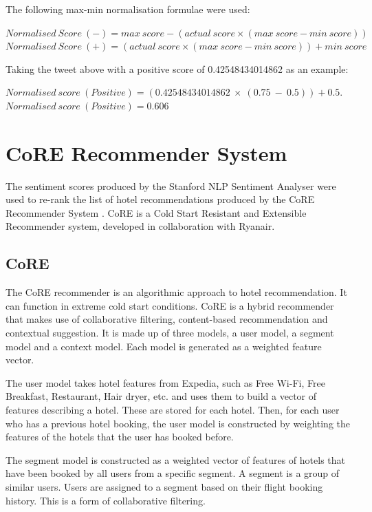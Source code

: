 The following max-min normalisation formulae were used:

\begin{tcolorbox}[title=Normalisation]
$Normalised\ Score\ (-) = max\ score-(actual\ score \times (max\ score - min\ score))$
$Normalised\ Score\ (+) = (actual\ score \times (max\ score - min\ score)) + min\ score$
\end{tcolorbox}

Taking the tweet above with a positive score of 0.42548434014862 as an example:
\begin{tcolorbox}[title=Example]
$Normalised\ score\ (Positive) = (0.42548434014862\ \times\ (0.75\ -\ 0.5)) + 0.5.$
$Normalised\ score\ (Positive) = 0.606$
\end{tcolorbox}

\section{CoRE Recommender System}

The sentiment scores produced by the Stanford NLP Sentiment Analyser \cite{stanfordSentiment2013} were used to re-rank the list of hotel recommendations produced by the CoRE Recommender System \cite{core2019}. CoRE is a Cold Start Resistant and Extensible Recommender system, developed in collaboration with Ryanair. 

\subsection{CoRE}

The CoRE recommender is an algorithmic approach to hotel recommendation. It can function in extreme cold start conditions. CoRE is a hybrid recommender that makes use of collaborative filtering, content-based recommendation and contextual suggestion. It is made up of three models, a user model, a segment model and a context model. Each model is generated as a weighted feature vector.

The user model takes hotel features from Expedia, such as Free Wi-Fi, Free Breakfast, Restaurant, Hair dryer, etc. and uses them to build a vector of features describing a hotel. These are stored for each hotel. Then, for each user who has a previous hotel booking, the user model is constructed by weighting the features of the hotels that the user has booked before.

The segment model is constructed as a weighted vector of features of hotels that have been booked by all users from a specific segment. A segment is a group of similar users. Users are assigned to a segment based on their flight booking history. This is a form of collaborative filtering.

